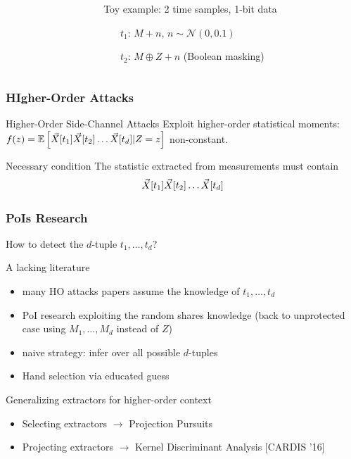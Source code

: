\begin{frame}
{\begin{columns}
\begin{column}{.5\textwidth}
\end{column}
\begin{column}{.5\textwidth}
\begin{block}{}
Toy example: 2 time samples, 1-bit data
\begin{itemize}
\item[$t_1$:] $M + n$, $n\sim \mathcal{N}(0,0.1)$ 
\item[$t_2$:] $M\oplus Z + n$ (Boolean masking)
\end{itemize}
\end{block}
\end{column}
\end{columns}
}

\end{frame}
\begin{frame}
\frametitle{HIgher-Order Attacks}
\begin{block}{Higher-Order Side-Channel Attacks}
Exploit higher-order statistical moments: \\
$f(z) = \mathbb{E}\left[\vec{X}[t_1]\vec{X}[t_2]\dots\vec{X}[t_d]\lvert Z=z\right]$ non-constant.
 \end{block}

\begin{block}{Necessary condition}
\cite{carlet2014achieving} The statistic extracted from measurements must contain  $$\vec{X}[t_1]\vec{X}[t_2]\dots\vec{X}[t_d]$$
\end{block} 
\end{frame}

\begin{frame}
\frametitle{PoIs Research}
How to detect the $d$-tuple $t_1,\dots, t_d$? 
\begin{block}{A lacking literature}
\begin{itemize}
\item many HO attacks papers assume the knowledge of $t_1,\dots, t_d$
\item PoI research exploiting the random shares knowledge (back to unprotected case using $M_1,\dots , M_d$ instead of $Z$)
\item naive strategy: infer over all possible $d$-tuples 
\item Hand selection via educated guess \cite{Oswald2006}
\end{itemize}
\end{block}

\begin{block}{Generalizing extractors for higher-order context}
\begin{itemize}
\item Selecting extractors $\longrightarrow$ Projection Pursuits \cite{PP}
\item Projecting extractors $\longrightarrow$ Kernel Discriminant Analysis [CARDIS '16]
\end{itemize}
\end{block}
\end{frame}

